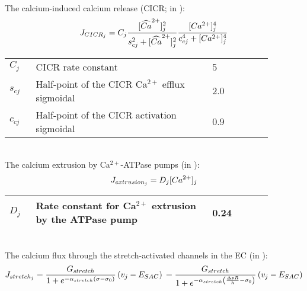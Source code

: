 \\
%
The calcium-induced calcium release (CICR; in \uMs):
\begin{equation} \label{eq:JCICRJ}
J_{CICR_{j}} = C_{j}\frac{[\widehat{Ca}^{2+}]_{j}^{2}}{s_{cj}^{2}+[\widehat{Ca}^{2+}]_{j}^{2}}    \frac{[Ca^{2+}]_{j}^{4}}{c_{cj}^{4}+[Ca^{2+}]_{j}^{4}}
\end{equation}
%
\begin{table}[h!]
\centering
\begin{tabular}{| p{0.09\linewidth} | >{\footnotesize} p{0.6\linewidth} | >{\footnotesize} p{0.17\linewidth} | >{\footnotesize} p{0.02\linewidth} |}
\arrayrulecolor{lightgrey}\hline
$C_{j}$      			& CICR rate constant									& 5 \uMs		& \cite{Koenigsberger2006} \\
$s_{cj}$				& Half-point of the CICR Ca$^{2+}$ efflux sigmoidal			& 2.0 \uM		& \cite{Koenigsberger2006} \\
$c_{cj}$				& Half-point of the CICR activation sigmoidal			& 0.9 \uM		& \cite{Koenigsberger2006} \\
\hline
\end{tabular}
\label{tab:JCICRj}
\end{table}
\\
The calcium extrusion by Ca$^{2+}$-ATPase pumps (in \uMs):
\begin{equation} \label{eq:Jextrusionj}
J_{extrusion_{j}} = D_{j}[Ca^{2+}]_{j} 
\end{equation}
%
%
\begin{table}[h!]
\centering
\begin{tabular}{| p{0.09\linewidth} | >{\footnotesize} p{0.6\linewidth} | >{\footnotesize} p{0.17\linewidth} | >{\footnotesize} p{0.02\linewidth} |}
\arrayrulecolor{lightgrey}\hline
$D_{j}$      			& Rate constant for Ca$^{2+}$ extrusion by the ATPase pump		 & 0.24	\pers			& \cite{Koenigsberger2005} \\
\hline
\end{tabular}
\label{tab:Jextrusionj}
\end{table}
\\
%
\newpage 
The calcium flux through the stretch-activated channels in the EC (in \uMs): 
\begin{equation} \label{eq:Jstretchj}
J_{stretch_{j}}= \frac{G_{stretch}}{1+ e^{-\alpha_{stretch}  \left(  \sigma -\sigma_{0}   \right) }}  \left(  v_{j}-E_{SAC}   \right) \\
= \frac{G_{stretch}}{1+ e^{-\alpha_{stretch}  \left(  \frac{\Delta pR}{h} -\sigma_{0}   \right) }}  \left(  v_{j}-E_{SAC}   \right) 
\end{equation}
